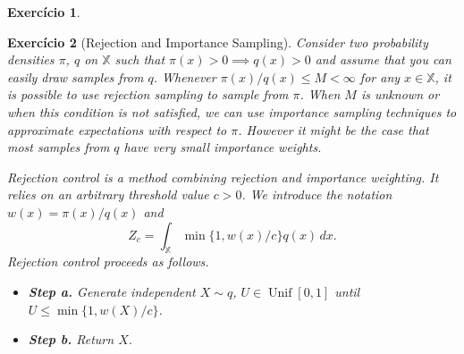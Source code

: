 \documentclass[a4paper,12pt]{article}
\newcommand{\unif}{\operatorname{Unif}}
\newtheorem{exercise}{Exercício}
\theoremstyle{definition}
\begin{document}
\begin{exercise}
    
\end{exercise}

\begin{exercise}[Rejection and Importance Sampling]
    Consider two probability densities $\pi$, $q$ on $\mathbb{X}$ such that
    $\pi(x) > 0 \implies q(x) > 0$ and assume that you can easily draw samples
    from $q$. Whenever $\pi(x)/q (x) \le M < \infty$ for any $x \in
    \mathbb{X}$, it is possible to use rejection sampling to sample from
    $\pi$. When $M$ is unknown or when this condition is not satisfied, we can
    use importance sampling techniques to approximate expectations 
    with respect to $\pi$. However it might be the case that most 
    samples from $q$ have very small importance weights. 
    
    Rejection control is a method combining rejection and 
    importance weighting. It relies on an arbitrary threshold 
    value $c > 0$. We introduce the notation $w (x) = \pi (x) /q (x)$ 
    and
    $$
    Z_c = \int_{\mathbb{X}} \min\{{1, w(x) / c}\} q(x) \, dx.
    $$
    Rejection control proceeds as follows. 
    \begin{itemize}
        \item {\bf Step a.} Generate independent $X \sim q$, 
        $U \in \unif[0,1]$ until $U \le \min\{{1, w (X) /c }\}$.
        \item {\bf Step b.} Return $X$.  
    \end{itemize}
\end{exercise}
\end{document}
